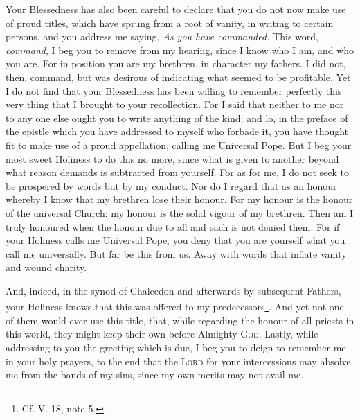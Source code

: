 Your Blessedness has also been careful to declare that you do not now make use of proud titles, which have sprung from a root of vanity, in writing to certain persons, and you address me saying, \emph{As you have commanded.} This word, \emph{command}, I beg you to remove from my hearing, since I know who I am, and who you are. For in position you are my brethren, in character my fathers. I did not, then, command, but was desirous of indicating what seemed to be profitable. Yet I do not find that your Blessedness has been willing to remember perfectly this very thing that I brought to your recollection. For I said that neither to me nor to any one else ought you to write anything of the kind; and lo, in the preface of the epistle which you have addressed to myself who forbade it, you have thought fit to make use of a proud appellation, calling me Universal Pope. But I beg your most sweet Holiness to do this no more, since what is given to another beyond what reason demands is subtracted from yourself. For as for me, I do not seek to be prospered by words but by my conduct. Nor do I regard that as an honour whereby I know that my brethren lose their honour. For my honour is the honour of the universal Church: my honour is the solid vigour of my brethren. Then am I truly honoured when the honour due to all and each is not denied them. For if your Holiness calls me Universal Pope, you deny that you are yourself what you call me universally. But far be this from us. Away with words that inflate vanity and wound charity.

And, indeed, in the synod of Chalcedon and afterwards by subsequent Fathers, your Holiness knows that this was offered to my predecessors\footnote{Cf. V. 18, note 5.}. And yet not one of them would ever use this title, that, while regarding the honour of all priests in this world, they might keep their own before Almighty \textsc{God}. Lastly, while addressing to you the greeting which is due, I beg you to deign to remember me in your holy prayers, to the end that the \textsc{Lord} for your intercessions may absolve me from the bands of my sins, since my own merits may not avail me.
